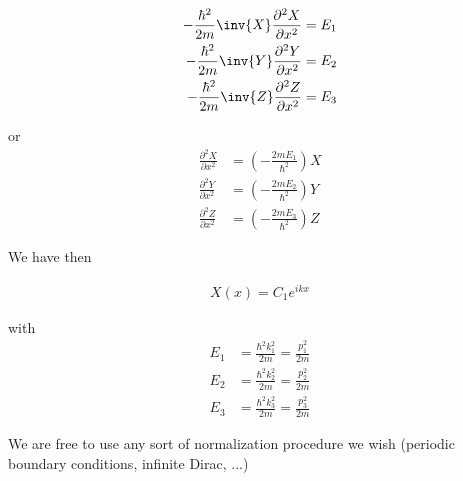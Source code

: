 \begin{align*}
-\frac{\hbar^2}{2m} \inv{X} \frac{\partial^2 X}{\partial {x}^2} &= E_1 \\
-\frac{\hbar^2}{2m} \inv{Y} \frac{\partial^2 Y}{\partial {x}^2} &= E_2 \\
-\frac{\hbar^2}{2m} \inv{Z} \frac{\partial^2 Z}{\partial {x}^2} &= E_3
\end{align*}

or
\begin{align*}
\frac{\partial^2 X}{\partial {x}^2} &= \left( - \frac{2m E_1}{\hbar^2} \right) X  \\
\frac{\partial^2 Y}{\partial {x}^2} &= \left( - \frac{2m E_2}{\hbar^2} \right) Y  \\
\frac{\partial^2 Z}{\partial {x}^2} &= \left( - \frac{2m E_3}{\hbar^2} \right) Z
\end{align*}

We have then

\begin{align*}
X(x) = C_1 e^{i k x}
\end{align*}

with
\begin{align*}
E_1 &= \frac{\hbar^2 k_1^2 }{2m} = \frac{p_1^2}{2m} \\
E_2 &= \frac{\hbar^2 k_2^2 }{2m} = \frac{p_2^2}{2m} \\
E_3 &= \frac{\hbar^2 k_3^2 }{2m} = \frac{p_3^2}{2m}
\end{align*}

We are free to use any sort of normalization procedure we wish (periodic boundary conditions, infinite Dirac, ...)

